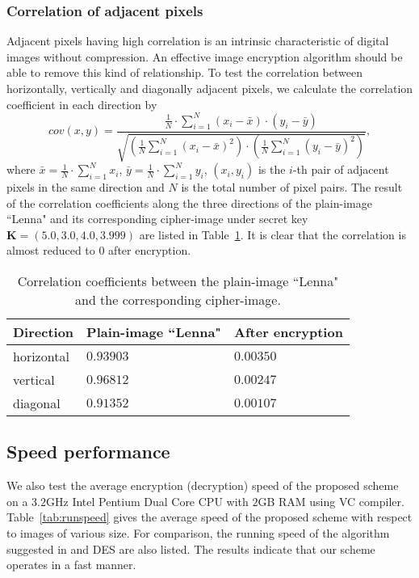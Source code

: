 \documentclass[3p,preprint,11pt]{elsarticle}
\begin{document}
\subsubsection{Correlation of adjacent pixels}
Adjacent pixels having high correlation
is an intrinsic characteristic of digital images without compression.
An effective image encryption algorithm should be able to remove this kind of relationship. To test the correlation
between horizontally, vertically and diagonally adjacent pixels,
we calculate the correlation coefficient in each direction by
\begin{equation*}
cov(x,y)=\frac{ \frac{1}{N}\cdot \sum_{i=1}^N (x_i- \bar{x}) \cdot (y_i- \bar{y} ) }
{\sqrt{(\frac {1}{N} \sum_{i=1}^N(x_i- \bar{x})^2)\cdot (\frac {1}{N} \sum_{i=1}^N( y_i- \bar{y} )^2)}},
\end{equation*}
where $\bar{x}=\frac{1}{N} \cdot \sum_{i=1}^N x_i$, $\bar{y}= \frac{1}{N} \cdot \sum_{i=1}^N y_i$, $(x_i, y_i)$ is
the $i$-th pair of adjacent pixels in the same direction and $N$ is the total number of pixel pairs.
The result of the correlation coefficients along the three directions of the plain-image ``Lenna" and its corresponding
cipher-image under secret key $\bm{K} = (5.0, 3.0, 4.0, 3.999)$ are listed in Table~\ref{tab:correaltionship}.
It is clear that the correlation is almost reduced to $0$ after encryption.
\begin{table}[!htb]
\centering \caption{Correlation coefficients between the plain-image ``Lenna" and the corresponding cipher-image.}
 \begin{tabular}{ p{4.2cm}  p{4.2cm}  p{4.2cm}}
\hline   Direction    & Plain-image ``Lenna"    & After encryption     \\
\hline      horizontal  & $0.93903$     & $0.00350$     \\
\hline      vertical    & $0.96812$     & $0.00247$    \\
\hline      diagonal    & $0.91352$     & $0.00107$     \\
\hline
\end{tabular}
\label{tab:correaltionship}
\end{table}

\subsection{Speed performance}
We also test the average encryption (decryption) speed of the proposed scheme on a $3.2$GHz Intel
Pentium Dual Core CPU with $2$GB RAM using VC compiler.
Table~\ref{tab:runspeed} gives the average speed of the
proposed scheme with respect to images of various size.
For comparison, the running speed of the algorithm suggested in \cite{Chen:3DChaoticCipher:CSF04} and DES
are also listed. The results indicate that our scheme operates in a fast manner.
\end{document}
